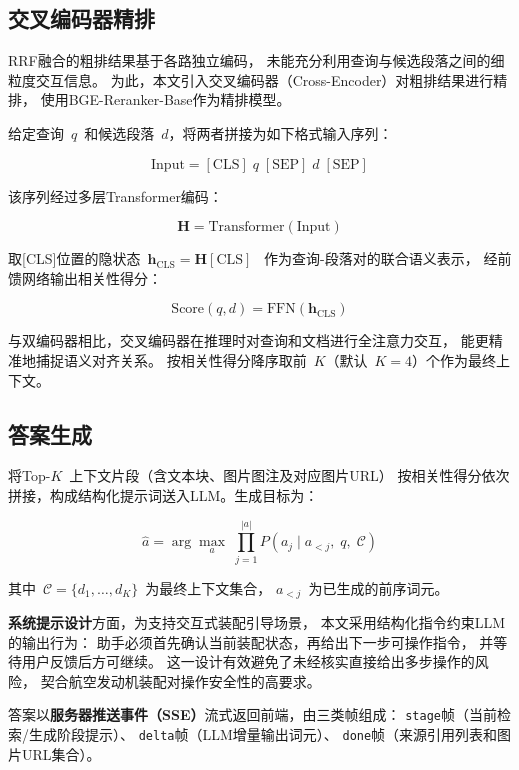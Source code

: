 \subsection{交叉编码器精排}
\label{sec:rerank}

RRF融合的粗排结果基于各路独立编码，
未能充分利用查询与候选段落之间的细粒度交互信息。
为此，本文引入交叉编码器（Cross-Encoder）对粗排结果进行精排，
使用BGE-Reranker-Base作为精排模型。

给定查询~$q$~和候选段落~$d$，将两者拼接为如下格式输入序列：

\begin{equation}
  \text{Input} = [\text{CLS}]\; q\; [\text{SEP}]\; d\; [\text{SEP}]
  \label{eq:rerank-input}
\end{equation}

该序列经过多层Transformer编码：

\begin{equation}
  \mathbf{H} = \text{Transformer}(\text{Input})
  \label{eq:rerank-transformer}
\end{equation}

取[CLS]位置的隐状态~$\mathbf{h}_{\text{CLS}} = \mathbf{H}[\text{CLS}]$~
作为查询-段落对的联合语义表示，
经前馈网络输出相关性得分：

\begin{equation}
  \text{Score}(q, d) = \text{FFN}(\mathbf{h}_{\text{CLS}})
  \label{eq:rerank-score}
\end{equation}

与双编码器相比，交叉编码器在推理时对查询和文档进行全注意力交互，
能更精准地捕捉语义对齐关系。
按相关性得分降序取前~$K$（默认~$K=4$）个作为最终上下文。

\subsection{答案生成}
\label{sec:generation}

将Top-$K$~上下文片段（含文本块、图片图注及对应图片URL）
按相关性得分依次拼接，构成结构化提示词送入LLM。生成目标为：

\begin{equation}
  \hat{a} = \arg\max_{a}\;
  \prod_{j=1}^{|a|}
  P\!\left(a_j \mid a_{<j},\; q,\; \mathcal{C}\right)
  \label{eq:generation}
\end{equation}

其中~$\mathcal{C} = \{d_1, \ldots, d_K\}$~为最终上下文集合，
$a_{<j}$~为已生成的前序词元。

\textbf{系统提示设计}方面，为支持交互式装配引导场景，
本文采用结构化指令约束LLM的输出行为：
助手必须首先确认当前装配状态，再给出下一步可操作指令，
并等待用户反馈后方可继续。
这一设计有效避免了未经核实直接给出多步操作的风险，
契合航空发动机装配对操作安全性的高要求。

答案以\textbf{服务器推送事件（SSE）}流式返回前端，由三类帧组成：
\texttt{stage}帧（当前检索/生成阶段提示）、
\texttt{delta}帧（LLM增量输出词元）、
\texttt{done}帧（来源引用列表和图片URL集合）。
